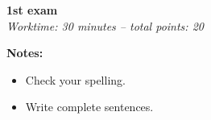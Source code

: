\documentclass[12pt,a4paper]{exam}
\begin{document}
\begin{center}
\textbf{\Large 1st exam}\\[1ex]
\textit{Worktime: 30 minutes – total points: 20}
\end{center}
\vspace{1em}

\noindent\textbf{Notes:}
\begin{itemize}[noitemsep,topsep=0pt,parsep=0pt,partopsep=0pt]
  \item Check your spelling.
  \item Write complete sentences.
\end{itemize}

\begin{questions}



\end{questions}

\end{document}
